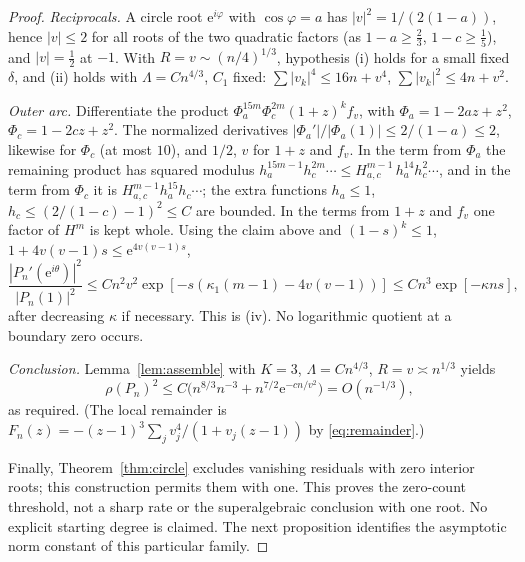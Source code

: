 \documentclass[11pt]{article}
\theoremstyle{remark}\newtheorem{remark}[theorem]{Remark}
\newcommand{\ee}{\mathrm e}
\begin{document}
\begin{proof}
\emph{Reciprocals.} A circle root \(\ee^{i\varphi}\) with \(\cos\varphi=a\)
has \(|v|^2=1/(2(1-a))\), hence \(|v|\le2\) for all roots of the two
quadratic factors (as \(1-a\ge\frac23\), \(1-c\ge\frac15\)), and \(|v|=\frac12\) at \(-1\). With
\(R=v\sim(n/4)^{1/3}\), hypothesis (i) holds for a small fixed \(\delta\),
and (ii) holds with \(\Lambda=Cn^{4/3}\), \(C_1\) fixed:
\(\sum|v_k|^4\le16n+v^4\), \(\sum|v_k|^2\le4n+v^2\).

\emph{Outer arc.} Differentiate the product
\(\Phi_a^{15m}\Phi_c^{2m}(1+z)^kf_v\), with
\(\Phi_a=1-2az+z^2\), \(\Phi_c=1-2cz+z^2\). The normalized derivatives
\(|\Phi_a'|/|\Phi_a(1)|\le2/(1-a)\le2\), likewise for \(\Phi_c\) (at most \(10\)), and
\(1/2\), \(v\) for \(1+z\) and \(f_v\). In the term from \(\Phi_a\) the remaining
product has squared modulus
\(h_a^{15m-1}h_c^{2m}\cdots\le H_{a,c}^{m-1}\,h_a^{14}h_c^{2}\cdots\),
and in the term from \(\Phi_c\) it is
\(H_{a,c}^{m-1}h_a^{15}h_c\cdots\); the extra functions \(h_a\le1\),
\(h_c\le(2/(1-c)-1)^2\le C\) are bounded. In the terms from \(1+z\) and
\(f_v\) one factor of \(H^m\) is kept whole. Using the claim above and
\((1-s)^k\le1\), \(1+4v(v-1)s\le\ee^{4v(v-1)s}\),
\[
 \frac{|P_n'(\ee^{i\theta})|^2}{|P_n(1)|^2}\le Cn^{2}v^2
 \exp[-s(\kappa_1(m-1)-4v(v-1))]\le C n^{3}\exp[-\kappa ns],
\]
after decreasing \(\kappa\) if necessary. This is (iv). No logarithmic
quotient at a boundary zero occurs.

\emph{Conclusion.} Lemma~\ref{lem:assemble} with \(K=3\),
\(\Lambda=Cn^{4/3}\), \(R=v\asymp n^{1/3}\) yields
\[
 \rho(P_n)^2\le C\bigl(n^{8/3}n^{-3}+n^{7/2}\ee^{-cn/v^2}\bigr)
 =O(n^{-1/3}),
\]
as required. (The local remainder is \(F_n(z)=-(z-1)^3\sum_jv_j^4/(1+v_j(z-1))\) by
\eqref{eq:remainder}.)

Finally, Theorem~\ref{thm:circle} excludes vanishing residuals with
zero interior roots; this construction permits them with one.
This proves the zero-count threshold, not a sharp rate or the
superalgebraic conclusion with one root. No explicit starting
degree is claimed. The next proposition identifies the asymptotic
norm constant of this particular family.
\end{proof}
\end{document}
